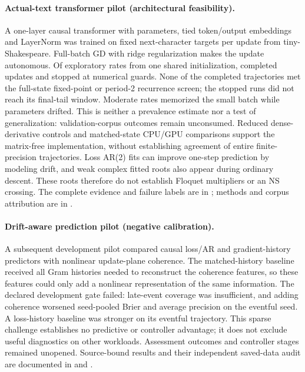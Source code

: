 \documentclass[11pt,letterpaper]{article}
\begin{document}
\paragraph{Actual-text transformer pilot (architectural feasibility).} A one-layer causal transformer with
\nLMParameters{} parameters, tied token/output embeddings and LayerNorm was trained on
\nLMTokens{} fixed next-character targets per update from tiny-Shakespeare. Full-batch GD with ridge regularization
makes the update autonomous. Of \nLMCases{} exploratory rates from one shared initialization,
\nLMCompleted{} completed \nLMUpdates{} updates and \nLMGuard{} stopped at numerical guards. None of the
completed trajectories met the full-state fixed-point or period-2 recurrence screen; the stopped runs did not
reach its final-tail window. Moderate rates memorized the small batch while parameters drifted. This is neither
a prevalence estimate nor a test of generalization: validation-corpus outcomes remain unconsumed.
Reduced dense-derivative controls and matched-state CPU/GPU comparisons support the matrix-free implementation,
without establishing agreement of entire finite-precision trajectories. Loss AR(2) fits can improve one-step
prediction by modeling drift, and weak complex fitted roots also appear during ordinary descent. These roots
therefore do not establish Floquet multipliers or an NS crossing. The complete evidence and failure labels are in
; methods and corpus attribution are in .

\paragraph{Drift-aware prediction pilot (negative calibration).} A subsequent development pilot compared
causal loss/AR and gradient-history predictors with nonlinear update-plane coherence. The matched-history
baseline received all Gram histories needed to reconstruct the coherence features, so these features could
only add a nonlinear representation of the same information. The declared development gate failed:
late-event coverage was insufficient, and adding coherence worsened seed-pooled Brier and average precision
on the eventful seed. A loss-history baseline was stronger on its eventful trajectory. This sparse challenge
establishes no predictive or controller advantage; it does not exclude useful diagnostics on other workloads.
Assessment outcomes and controller stages remained unopened. Source-bound results and their independent
saved-data audit are documented in  and
.
\end{document}
